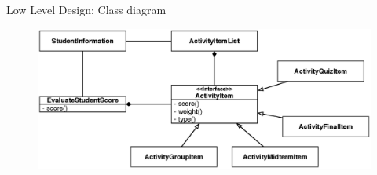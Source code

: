 \documentclass[14pt]{beamer}
\begin{document}
\begin{frame}[plain]{Low Level Design: Class diagram}
    \begin{figure}
        \center
        \includegraphics[width=\textwidth]{class-diagram}
        \label{fig:class-diagram}
    \end{figure}
\end{frame}

% 
% 
% 
 
\end{document}
